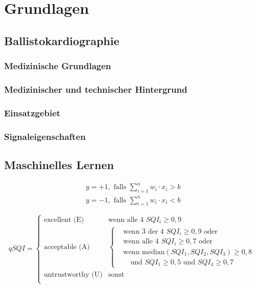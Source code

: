 \chapter{Grundlagen}\label{grundlagen}

\section{Ballistokardiographie}
	\subsection{Medizinische Grundlagen}
	\subsection{Medizinischer und technischer Hintergrund}
	\subsection{Einsatzgebiet}
	\subsection{Signaleigenschaften}

\section{Maschinelles Lernen}


\[
\begin{gathered}
	y = +1, \text{ falls } \sum_{i=1}^{n} w_i \cdot x_i > b \\
	y = -1, \text{ falls } \sum_{i=1}^{n} w_i \cdot x_i < b
\end{gathered}
\]

\[
qSQI = \begin{cases}
	\text{excellent (E)} & \text{wenn alle 4 } SQI_i \geq 0,9\\
	\text{acceptable (A)} & \begin{cases}
		& \text{wenn 3 der 4 } SQI_i \geq 0,9 \text{ oder}\\
		& \text{wenn alle 4 } SQI_i \geq 0,7 \text{ oder}\\
		& \text{wenn median}(SQI_1, SQI_2, SQI_3) \geq 0,8\\&\text{ }\text{	und } SQI_1 \geq 0,5 \text{ und } SQI_4 \geq 0,7
		\end{cases}\\
	\text{untrustworthy (U)} & \text{sonst}\\
\end{cases}
\]

